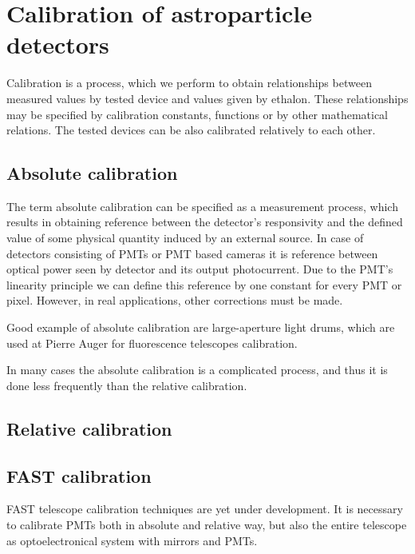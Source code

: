 
\chapter{Calibration of astroparticle detectors}
Calibration is a process, which we perform to obtain relationships between measured values by tested device and values given by ethalon. These relationships may be specified by calibration constants, functions or by other mathematical relations. The tested devices can be also calibrated relatively to each other.
\par
\section{Absolute calibration}
The term absolute calibration can be specified as a measurement process, which results in obtaining reference between the detector's responsivity and the defined value of some physical quantity induced by an external source. In case of detectors consisting of PMTs or PMT based cameras it is reference between optical power seen by detector and its output photocurrent. Due to the PMT's linearity principle we can define this reference by one constant for every PMT or pixel. However, in real applications, other corrections must be made.

\par
Good example of absolute calibration are large-aperture light drums, which are used at Pierre Auger for fluorescence telescopes calibration.

\par
In many cases the absolute calibration is a complicated process, and thus it is done less frequently than the relative calibration.

\section{Relative calibration}



\section{FAST calibration}
FAST telescope calibration techniques are yet under development. It is necessary to calibrate PMTs both in absolute and relative way, but also the entire telescope as optoelectronical system with mirrors and PMTs. 
